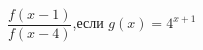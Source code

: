 \begin{ex}[type=calculate_expression]
	\begin{condition}
		\( \dfrac{f(x-1)}{f(x-4)} \),\quad если \( g(x)=4^{x+1} \)
	\end{condition}
\end{ex}